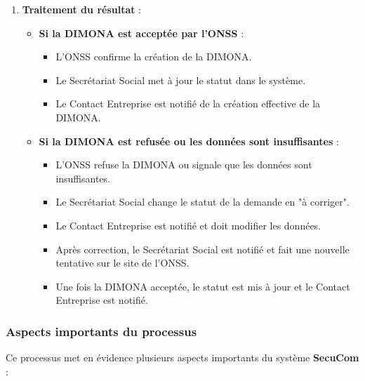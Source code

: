 \begin{enumerate}
  \item \textbf{Traitement du résultat} :
    \begin{itemize}
      \item \textbf{Si la DIMONA est acceptée par l'ONSS} :
        \begin{itemize}
          \item L'ONSS confirme la création de la DIMONA.
          \item Le Secrétariat Social met à jour le statut dans le système.
          \item Le Contact Entreprise est notifié de la création effective de la DIMONA.
        \end{itemize}
      \item \textbf{Si la DIMONA est refusée ou les données sont insuffisantes} :
        \begin{itemize}
          \item L'ONSS refuse la DIMONA ou signale que les données sont insuffisantes.
          \item Le Secrétariat Social change le statut de la demande en "à corriger".
          \item Le Contact Entreprise est notifié et doit modifier les données.
          \item Après correction, le Secrétariat Social est notifié et fait une nouvelle tentative sur le site de l'ONSS.
          \item Une fois la DIMONA acceptée, le statut est mis à jour et le Contact Entreprise est notifié.
        \end{itemize}
    \end{itemize}
\end{enumerate}

\subsubsection{Aspects importants du processus}

\noindent Ce processus met en évidence plusieurs aspects importants du système \textbf{SecuCom} :

